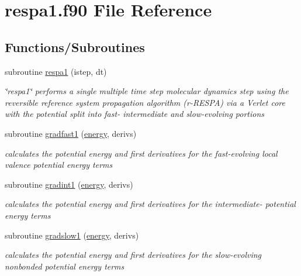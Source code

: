 \hypertarget{respa1_8f90}{\section{respa1.\-f90 File Reference}
\label{respa1_8f90}
}
\subsection*{Functions/\-Subroutines}
\begin{DoxyCompactItemize}
\item 
subroutine \hyperlink{respa1_8f90_a1ae4fccc5053991f8f1fb792bf4c7cd7}{respa1} (istep, dt)
\begin{DoxyCompactList}\small\item\em \char`\"{}respa1\char`\"{} performs a single multiple time step molecular dynamics step using the reversible reference system propagation algorithm (r-\/\-R\-E\-S\-P\-A) via a Verlet core with the potential split into fast-\/ intermediate and slow-\/evolving portions \end{DoxyCompactList}\item 
subroutine \hyperlink{respa1_8f90_afe48b7bbfef9844120e69ecb6d8775e4}{gradfast1} (\hyperlink{energy_8f90_a1aa8c625eb0a3eea79ed1a8047707c94}{energy}, derivs)
\begin{DoxyCompactList}\small\item\em calculates the potential energy and first derivatives for the fast-\/evolving local valence potential energy terms \end{DoxyCompactList}\item 
subroutine \hyperlink{respa1_8f90_a4bfb59bd56b5264e417811d81a43b85a}{gradint1} (\hyperlink{energy_8f90_a1aa8c625eb0a3eea79ed1a8047707c94}{energy}, derivs)
\begin{DoxyCompactList}\small\item\em calculates the potential energy and first derivatives for the intermediate-\/ potential energy terms \end{DoxyCompactList}\item 
subroutine \hyperlink{respa1_8f90_a809f43e903eab8a6eb11da3cacadb53b}{gradslow1} (\hyperlink{energy_8f90_a1aa8c625eb0a3eea79ed1a8047707c94}{energy}, derivs)
\begin{DoxyCompactList}\small\item\em calculates the potential energy and first derivatives for the slow-\/evolving nonbonded potential energy terms \end{DoxyCompactList}\item 

\end{DoxyCompactItemize}

